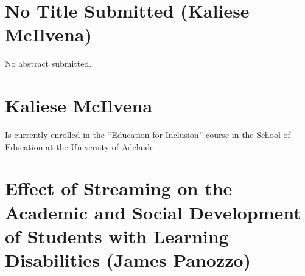 \documentclass[twoside,12pt,a4paper,notitlepage]{memoir}
\begin{document}
\pagebreak
\section*{No Title Submitted (Kaliese McIlvena)}
\label{aut:mcilvena}

No abstract submitted.

\section*{Kaliese McIlvena}

Is currently enrolled in the ``Education for Inclusion'' course in the School of Education at the University of Adelaide.



\pagebreak
\section*{Effect of Streaming on the Academic and Social Development of Students with Learning Disabilities (James Panozzo)}
\label{aut:panozzo}
\end{document}
